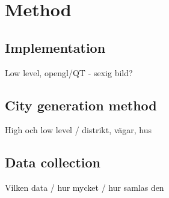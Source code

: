 \section{Method}
\subsection{Implementation}
Low level, opengl/QT - sexig bild?

\subsection{City generation method}
High och low level / distrikt, vägar, hus

\subsection{Data collection}
Vilken data / hur mycket / hur samlas den